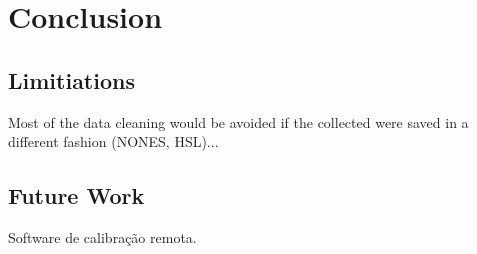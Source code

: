 
\chapter{Conclusion}
\label{chapter:conclusion}

\section{Limitiations}
\label{sec:limitations}
Most of the data cleaning would be avoided if the collected were saved in a different fashion (NONES, HSL)...

\section{Future Work}
\label{sec:future_work}
Software de calibração remota.
